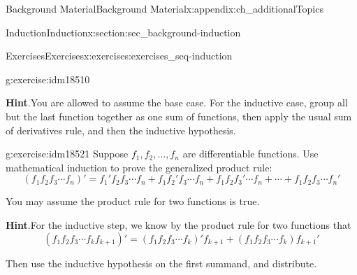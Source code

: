 \documentclass[oneside,10pt,]{book}
\numberwithin{equation}{chapter}
\begin{document}
\begin{appendixptx}{Background Material}{}{Background Material}{}{}{x:appendix:ch_additionalTopics}
\begin{sectionptx}{Induction}{}{Induction}{}{}{x:section:sec_background-induction}
\begin{exercises-subsection}{Exercises}{}{Exercises}{}{}{x:exercises:exercises_seq-induction}
\begin{divisionexercise}{22}{}{}{g:exercise:idm18510}
\par\smallskip%
\noindent\textbf{Hint}.\hypertarget{g:hint:idm18519}{}\quad{}You are allowed to assume the base case. For the inductive case, group all but the last function together as one sum of functions, then apply the usual sum of derivatives rule, and then the inductive hypothesis.%
\end{divisionexercise}%
\begin{divisionexercise}{23}{}{}{g:exercise:idm18521}%
Suppose \(f_1, f_2, \ldots, f_n\) are differentiable functions. Use mathematical induction to prove the generalized product rule:%
\begin{equation*}
(f_1 f_2 f_3 \cdots f_n)' = f_1' f_2 f_3 \cdots f_n + f_1 f_2' f_3 \cdots f_n + f_1 f_2 f_3' \cdots f_n + \cdots + f_1 f_2 f_3 \cdots f_n'
\end{equation*}
%
\par
You may assume the product rule for two functions is true.%
\par\smallskip%
\noindent\textbf{Hint}.\hypertarget{g:hint:idm18527}{}\quad{}For the inductive step, we know by the product rule for two functions that%
\begin{equation*}
(f_1f_2f_3 \cdots f_k f_{k+1})' = (f_1f_2f_3\cdots f_k)'f_{k+1} + (f_1f_2f_3\cdots f_k)f_{k+1}'
\end{equation*}
%
\par
Then use the inductive hypothesis on the first summand, and distribute.%
\end{divisionexercise}%
\end{exercises-subsection}
\end{sectionptx}
\end{appendixptx}
%
%
\typeout{************************************************}
\typeout{************************************************}
%
\end{document}
